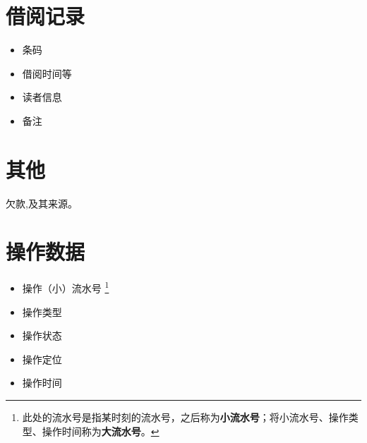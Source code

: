 \documentclass[UTF8]{ctexrep}
\begin{document}
    \section{借阅记录}
    \begin{itemize}
    	\item 条码
    	\item 借阅时间等
    	\item 读者信息
    	\item 备注
    \end{itemize}
    \section{其他}
    欠款,及其来源。
    \section{操作数据}
    \begin{itemize}
        \item 操作（小）流水号 \label{流水号}
        \footnote{\label{流水号:footnote}
            此处的流水号是指某时刻的流水号，之后称为\textbf{小流水号}；将小流水号、操作类型、操作时间称为\textbf{大流水号}。
            }
        \item 操作类型
        \item 操作状态
        \item 操作定位
        \item 操作时间
    \end{itemize}
\end{document}
